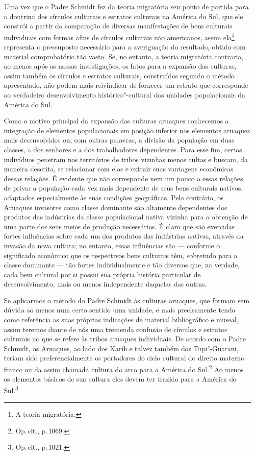 Uma vez que o Padre Schmidt fez da teoria migratória seu ponto de
partida para a doutrina dos círculos culturais e estratos culturais na
América do Sul, que ele constrói a partir da comparação de diversas
manifestações de bens culturais individuais com formas afins de
círculos culturais não americanos, assim ela\footnote{A teoria migratória.}
representa o pressuposto necessário para a averiguação do resultado,
obtido com material comprobatório tão vasto. Se, no entanto, a teoria
migratória contraria, ao menos após as nossas investigações, os fatos
para a expansão das culturas, assim também os círculos e
estratos culturais, construídos segundo o método apresentado, não podem
mais reivindicar de fornecer um retrato que corresponde ao verdadeiro
desenvolvimento histórico"-cultural das unidades populacionais da América
do Sul.

Como o motivo principal da expansão das culturas aruaques conhecemos a
integração de elementos populacionais em posição inferior nos elementos
aruaques mais desenvolvidos ou, com outras palavras, a divisão da
população em duas classes, a dos senhores e a dos trabalhadores
dependentes. Para esse fim, certos indivíduos penetram nos territórios
de tribos vizinhas menos cultas e buscam, da maneira descrita, se
relacionar com elas e extrair suas vantagens econômicas dessas relações.
É evidente que não corresponde nem um pouco a essas relações de privar
a população cada vez mais dependente de seus bens culturais nativos,
adaptados especialmente às suas condições geográficas. Pelo contrário,
os Aruaques invasores como classe dominante são altamente dependentes
dos produtos das indústrias da classe populacional nativa vizinha para
a obtenção de uma parte dos seus meios de produção necessários. É claro
que são exercidas fortes influências sobre cada um dos produtos das
indústrias nativas, através da invasão da nova cultura; no entanto,
essas influências são --- conforme o significado econômico que os
respectivos bens culturais têm, sobretudo para a classe dominante --- tão
fortes individualmente e tão diversos que, na verdade, cada bem cultural
por si possui sua própria história particular de desenvolvimento, mais
ou menos independente daquelas das outras.

Se aplicarmos o método do Padre Schmidt às culturas aruaques, que formam
sem dúvida ao menos num certo sentido uma unidade, e mais precisamente
tendo como referência as suas próprias indicações de material
bibliográfico e museal, assim teremos diante de nós uma tremenda
confusão de círculos e estratos culturais no que se refere às tribos
aruaques individuais. De acordo com o Padre Schmidt, os Aruaques, ao lado
dos Karib e talvez também dos Tupi"-Guarani, teriam sido
preferencialmente os portadores do ciclo cultural do direito materno
franco ou da assim
chamada cultura do arco para a América do Sul.\footnote{Op.\,cit., p.\,1069.} Ao menos os elementos básicos de sua cultura eles devem ter
trazido para a América do Sul.\footnote{Op.\,cit., p.\,1021.}

